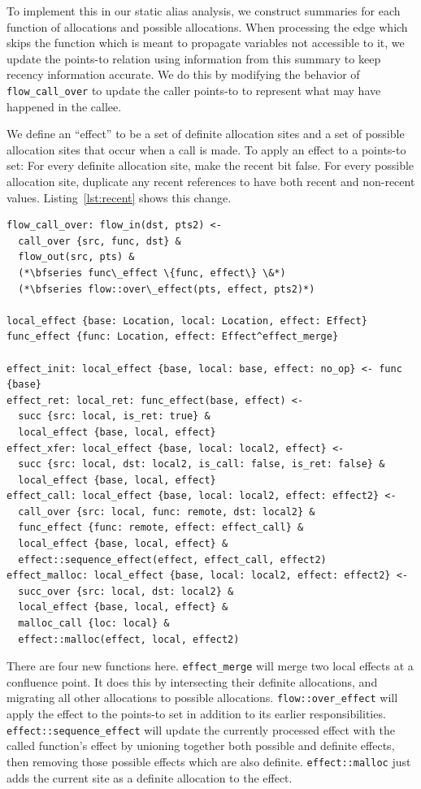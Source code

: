 To implement this in our static alias analysis, we construct summaries for each function of allocations and possible allocations.
When processing the edge which skips the function which is meant to propagate variables not accessible to it, we update the points-to relation using information from this summary to keep recency information accurate.
We do this by modifying the behavior of \texttt{flow\_call\_over} to update the caller points-to to represent what may have happened in the callee.

We define an ``effect'' to be a set of definite allocation sites and a set of possible allocation sites that occur when a call is made.
To apply an effect to a points-to set:
For every definite allocation site, make the recent bit false.
For every possible allocation site, duplicate any recent references to have both recent and non-recent values.
Listing~\ref{lst:recent} shows this change.

\begin{lstlisting}[float=*t, caption={Rules for Recent Domain}, label=lst:recent]
flow_call_over: flow_in(dst, pts2) <-
  call_over {src, func, dst} &
  flow_out(src, pts) &
  (*\bfseries func\_effect \{func, effect\} \&*)
  (*\bfseries flow::over\_effect(pts, effect, pts2)*)

local_effect {base: Location, local: Location, effect: Effect}
func_effect {func: Location, effect: Effect^effect_merge}

effect_init: local_effect {base, local: base, effect: no_op} <- func {base}
effect_ret: local_ret: func_effect(base, effect) <-
  succ {src: local, is_ret: true} &
  local_effect {base, local, effect}
effect_xfer: local_effect {base, local: local2, effect} <-
  succ {src: local, dst: local2, is_call: false, is_ret: false} &
  local_effect {base, local, effect}
effect_call: local_effect {base, local: local2, effect: effect2} <-
  call_over {src: local, func: remote, dst: local2} &
  func_effect {func: remote, effect: effect_call} &
  local_effect {base, local, effect} &
  effect::sequence_effect(effect, effect_call, effect2)
effect_malloc: local_effect {base, local: local2, effect: effect2} <-
  succ_over {src: local, dst: local2} &
  local_effect {base, local, effect} &
  malloc_call {loc: local} &
  effect::malloc(effect, local, effect2)
\end{lstlisting}

There are four new functions here.
\texttt{effect\_merge} will merge two local effects at a confluence point.
It does this by intersecting their definite allocations, and migrating all other allocations to possible allocations.
\texttt{flow::over\_effect} will apply the effect to the points-to set in addition to its earlier responsibilities.
\texttt{effect::sequence\_effect} will update the currently processed effect with the called function's effect by unioning together both possible and definite effects, then removing those possible effects which are also definite.
\texttt{effect::malloc} just adds the current site as a definite allocation to the effect.


